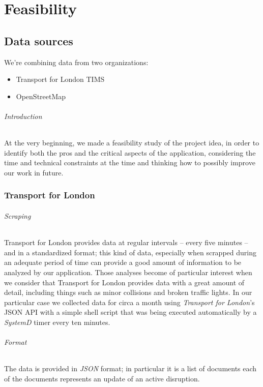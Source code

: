 
\part{Feasibility}
\chapter{Data sources}

We’re combining data from two organizations:

\begin{itemize}
	\item Transport for London TIMS
	\item OpenStreetMap
\end{itemize}

\paragraph{Introduction}
At the very beginning, we made a feasibility study of the project idea, in 
order to identify both the pros and the critical aspects of the application, 
considering the time and technical constraints at the time and thinking how to 
possibly improve our work in future.

\section{Transport for London}

\paragraph{Scraping}
Transport for London provides data at regular intervals – every five 
minutes –  and in a standardized format; this kind of data, especially when 
scrapped during an adequate period of time can provide a good amount of 
information to be analyzed by our application. Those analyses become of 
particular interest when we consider that Transport for London provides 
data with a great amount of detail, including things such as minor collisions 
and broken traffic lights. In our particular case we collected data for circa a 
month using \textit{Transport for London}’s JSON API with a simple shell script 
that was being executed 
automatically by a \textit{SystemD} timer every ten minutes.

\paragraph{Format}
The data is provided in \textit{JSON} format; in particular it is a list of 
documents each of the documents represents an update of an active disruption.

